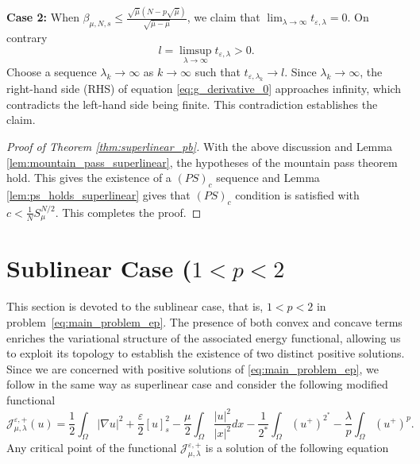 \documentclass[11pt]{article}
\newcommand{\om} {\Omega}
\newcommand{\noi} {\noindent}
\newcommand{\grad}{\nabla}
\newcommand{\Jep}{\mathcal{J}_{\mu, \lambda}^{\varepsilon,+}}
\begin{document}
\textbf{Case 2:} When $\beta_{\mu,N,s} \leq \frac{ \sqrt{\bar{\mu}} {(N - p\sqrt{\bar{\mu}})}}{{\sqrt{\bar{\mu} - \mu}}}$, we claim that $\displaystyle \lim_{\lambda \to \infty} t_{\varepsilon, \lambda} = 0$. On contrary
\begin{equation*}
l = \limsup_{\lambda \to \infty} t_{\varepsilon, \lambda} > 0.
\end{equation*}
Choose a sequence \( \lambda_k \to \infty \) as \( k \to \infty \) such that $t_{\varepsilon, \lambda_k} \to l$. Since \( \lambda_k \to \infty \), the right-hand side (RHS) of equation \eqref{eq:g_derivative_0} approaches infinity, which contradicts the left-hand side being finite. This contradiction establishes the claim.


\begin{proof}[Proof of Theorem \ref{thm:superlinear_pb}]
With the above discussion and Lemma \ref{lem:mountain_pass_superlinear}, the hypotheses of the mountain pass theorem hold. This gives the existence of a $(PS)_c$ sequence and Lemma \ref{lem:ps_holds_superlinear} gives that $(PS)_c$ condition is satisfied with $c < \frac{1}{N} S_{\mu}^{N/2}$. This completes the proof. 
\end{proof}






\section{Sublinear Case (\texorpdfstring{$1<p<2$})}\label{sec:sublinear}
This section is devoted to the sublinear case, that is, \( 1 < p < 2 \) in problem~\eqref{eq:main_problem_ep}. The presence of both convex and concave terms enriches the variational structure of the associated energy functional, allowing us to exploit its topology to establish the existence of two distinct positive solutions. Since we are concerned with positive solutions of \eqref{eq:main_problem_ep}, we follow in the same way as superlinear case and consider the following modified functional
\begin{equation*}
\Jep(u) = \frac{1}{2} \int_{\om} |\grad u|^2 + \frac{\varepsilon}{2} [u]_s^2 - \frac{\mu}{2} \int_{\Omega} \frac{|u|^2}{|x|^2} dx 
- \frac{1}{2^*} \int_{\Omega} (u^+)^{2^*} - \frac{\lambda}{p} \int_{\Omega} (u^+)^{p}.
\end{equation*}
\noi Any critical point of the functional \( \Jep \) is a solution of the following equation
\end{document}
